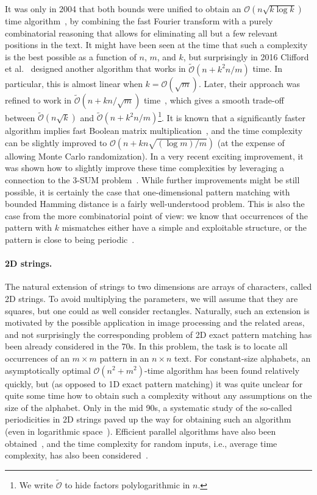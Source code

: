 \documentclass[11pt, letterpaper]{article}
\theoremstyle{plain}
\theoremstyle{definition}
\theoremstyle{remark}
\renewcommand{\O}{\mathcal{O}}
\newcommand{\tO}{\tilde{\mathcal{O}}}
\begin{document}
It was only in 2004 that both bounds were unified to obtain an $\O(n\sqrt{k \log k})$ time algorithm~\cite{Amir2004},
by combining the fast Fourier transform with a purely combinatorial reasoning that allows for eliminating all but a few relevant positions
in the text. It might have been seen at the time that such a complexity is the best possible as a function of $n$, $m$, and $k$,
but surprisingly in 2016 Clifford et al.~\cite{Clifford2016a} designed another algorithm that works
in $\tO(n + k^2n/m)$ time. In particular, this is almost linear when $k=\O(\sqrt{m})$. Later, their
approach was refined to work in $\tO(n + kn/\sqrt{m})$ time~\cite{Gawrychowski2018},
which gives a smooth trade-off between $\tO(n\sqrt{k})$ and $\tO(n + k^2n/m)$\footnote{We write $\tO$ to hide factors polylogarithmic in $n$.}. 
It is known that a significantly faster algorithm implies fast Boolean matrix multiplication~\cite{Gawrychowski2018},
and the time complexity can be slightly improved to $\O(n + kn\sqrt{(\log m) / m})$ \cite{Chan2020} (at the expense
of allowing Monte Carlo randomization). In a very recent exciting improvement, it was shown how to slightly improve
these time complexities by leveraging a connection to the 3-SUM problem~\cite{Chan0WX23}.
While further improvements might be still possible, it is certainly the case that one-dimensional pattern matching with
bounded Hamming distance is a fairly well-understood problem.
This is also the case from the more combinatorial point of view: we know that occurrences of the pattern with $k$ mismatches
either have a simple and exploitable structure, or the pattern is close to being periodic~\cite{Bringmann2019,Charalampopoulos2020a}.

\paragraph{2D strings.} The natural extension of strings to two dimensions are arrays of characters, called 2D strings. 
To avoid multiplying the parameters, we will assume that they are squares, but one could as well consider rectangles.
Naturally, such an extension is motivated by the possible application in image processing and the related areas,
and not surprisingly the corresponding problem of 2D exact pattern matching has been already considered in the 70s.
In this problem, the task is to locate all occurrences of an $m\times m$ pattern in an $n\times n$ text.
For constant-size alphabets, an asymptotically optimal $\O(n^{2}+m^{2})$-time algorithm has been found relatively
quickly, but (as opposed to 1D exact pattern matching) it was quite unclear for quite some time how to obtain
such a complexity without any assumptions on the size of the alphabet. Only in the mid 90s, a systematic
study of the so-called periodicities in 2D strings paved up the way for obtaining such an algorithm~\cite{Amir1994,Galil1996}
(even in logarithmic space~\cite{Crochemore1995}). Efficient parallel algorithms have also been obtained~\cite{Crochemore1998,Crochemore1998},
and the time complexity for random inputs, i.e., average time complexity, has also been considered~\cite{Baeza-Yates1993,Tarhio1996,Kaerkkaeinen1999}.
\end{document}
